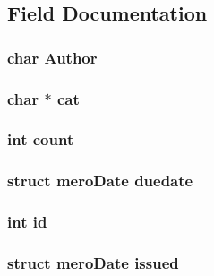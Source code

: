 \subsection{Field Documentation}
\hypertarget{structbooks_a90759739feb83da85334478c78abe027}{
\subsubsection[{Author}]{\setlength{\rightskip}{0pt plus 5cm}char Author}}\label{structbooks_a90759739feb83da85334478c78abe027}
\hypertarget{structbooks_a48e71daf5632ed64d2ae931391d43854}{
\subsubsection[{cat}]{\setlength{\rightskip}{0pt plus 5cm}char $\ast$ cat}}\label{structbooks_a48e71daf5632ed64d2ae931391d43854}
\hypertarget{structbooks_ad43c3812e6d13e0518d9f8b8f463ffcf}{
\subsubsection[{count}]{\setlength{\rightskip}{0pt plus 5cm}int count}}\label{structbooks_ad43c3812e6d13e0518d9f8b8f463ffcf}
\hypertarget{structbooks_adea367e45aa32968b0c8a5fd72781e22}{
\subsubsection[{duedate}]{\setlength{\rightskip}{0pt plus 5cm}struct {\bf mero\+Date} duedate}}\label{structbooks_adea367e45aa32968b0c8a5fd72781e22}
\hypertarget{structbooks_a7441ef0865bcb3db9b8064dd7375c1ea}{
\subsubsection[{id}]{\setlength{\rightskip}{0pt plus 5cm}int id}}\label{structbooks_a7441ef0865bcb3db9b8064dd7375c1ea}
\hypertarget{structbooks_a722d044aa88e5133b38d6ac9fb58127e}{
\subsubsection[{issued}]{\setlength{\rightskip}{0pt plus 5cm}struct {\bf mero\+Date} issued}}\label{structbooks_a722d044aa88e5133b38d6ac9fb58127e}
